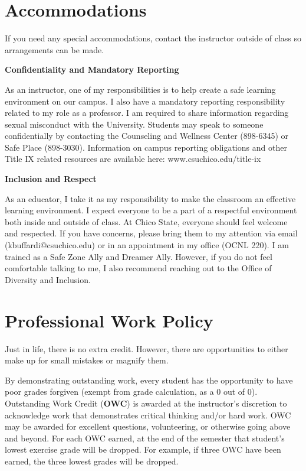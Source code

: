 \documentclass[12pt]{article}
\begin{document}
  \section*{Accommodations}

  If you need any special accommodations, contact the instructor outside of class so arrangements can be made.

  \medskip
  \textbf{Confidentiality and Mandatory Reporting}

  \smallskip
  As an instructor, one of my responsibilities is to help create a safe learning environment on our campus.  I also have a mandatory reporting responsibility related to my role as a professor.  I am required to share information regarding sexual misconduct with the University. Students may speak to someone confidentially by contacting the Counseling and Wellness Center (898-6345) or Safe Place (898-3030).  Information on campus reporting obligations and other Title IX related resources are available here: www.csuchico.edu/title-ix

  \medskip
  \textbf{Inclusion and Respect}

  \smallskip
  As an educator, I take it as my responsibility to make the classroom an effective learning environment. I expect everyone to be a part of a respectful environment both inside and outside of class. At Chico State, everyone should feel welcome and respected. If you have concerns, please bring them to my attention via email (kbuffardi@csuchico.edu) or in an appointment in my office (OCNL 220). I am trained as a Safe Zone Ally and Dreamer Ally. However, if you do not feel comfortable talking to me, I also recommend reaching out to the Office of Diversity and Inclusion.

  \section*{Professional Work Policy}

  Just in life, there is no extra credit. However, there are opportunities to either make up for small mistakes or magnify them.

  By demonstrating outstanding work, every student has the opportunity to have poor grades forgiven (exempt from grade calculation, as a 0 out of 0). Outstanding Work Credit (\textbf{OWC}) is awarded at the instructor's discretion to acknowledge work that demonstrates critical thinking and/or hard work. OWC may be awarded for excellent questions, volunteering, or otherwise going above and beyond. For each OWC earned, at the end of the semester that student's lowest exercise grade will be dropped. For example, if three OWC have been earned, the three lowest grades will be dropped.
\end{document}
